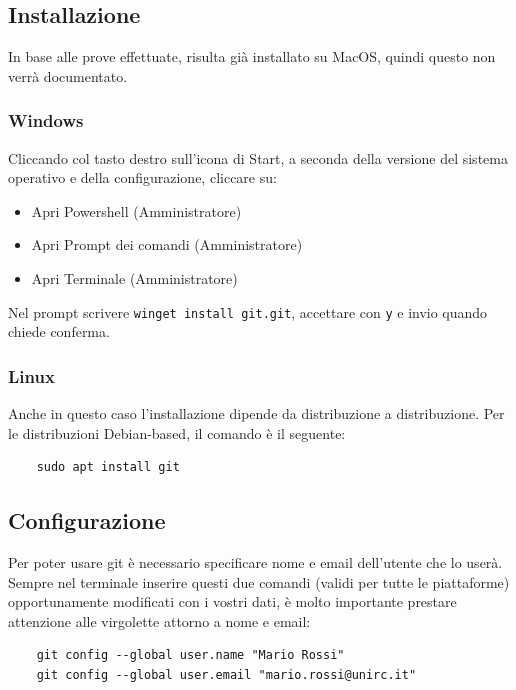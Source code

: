 \documentclass[envcountsame,envcountchap]{svmono}
\begin{document}
\subsection{Installazione \citep{installGit}}
In base alle prove effettuate, risulta già installato su MacOS, quindi questo non verrà documentato.
\subsubsection{Windows}
Cliccando col tasto destro sull'icona di Start, a seconda della versione del sistema operativo e della configurazione, cliccare su:
\begin{itemize}
    \item Apri Powershell (Amministratore)
    \item Apri Prompt dei comandi (Amministratore)
    \item Apri Terminale (Amministratore)
\end{itemize}
Nel prompt scrivere {\tt winget install git.git}, accettare con {\tt y} e invio quando chiede conferma.

\subsubsection{Linux}
Anche in questo caso l'installazione dipende da distribuzione a distribuzione. Per le distribuzioni Debian-based, il comando è il seguente:
\begin{verbatim}
    sudo apt install git
\end{verbatim}

\subsection{Configurazione}
Per poter usare git è necessario specificare nome e email dell'utente che lo userà.
Sempre nel terminale inserire questi due comandi (validi per tutte le piattaforme) opportunamente modificati con i vostri dati, è molto 
importante prestare attenzione alle virgolette attorno a nome e email:
\begin{verbatim}
    git config --global user.name "Mario Rossi"
    git config --global user.email "mario.rossi@unirc.it"
\end{verbatim}
\end{document}
